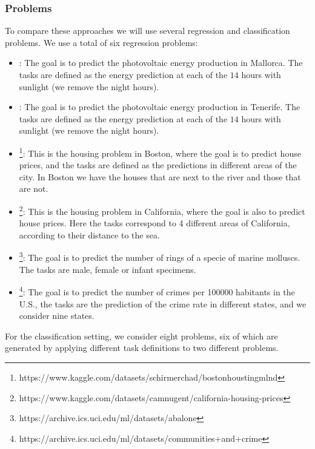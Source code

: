 \subsubsection*{Problems}
To compare these approaches we will use several regression and classification problems. We use a total of six regression problems:
\begin{itemize}
    \item {}: The goal is to predict the photovoltaic energy production in Mallorca. The tasks are defined as the energy prediction at each of the $14$ hours with sunlight (we remove the night hours).
    \item {}: The goal is to predict the photovoltaic energy production in Tenerife. The tasks are defined as the energy prediction at each of the $14$ hours with sunlight (we remove the night hours).
    \item {}\footnote{https://www.kaggle.com/datasets/schirmerchad/bostonhoustingmlnd}: This is the housing problem in Boston, where the goal is to predict house prices, and the tasks are defined as the predictions in different areas of the city. In Boston we have the houses that are next to the river and those that are not. 
    \item {}\footnote{https://www.kaggle.com/datasets/camnugent/california-housing-prices}: This is the housing problem in California, where the goal is also to predict house prices. Here the tasks correspond to 4 different areas of California, according to their distance to the sea.
    \item {}\footnote{https://archive.ics.uci.edu/ml/datasets/abalone}: The goal is to predict the number of rings of a specie of marine molluscs. The tasks are male, female or infant specimens.
    \item {}\footnote{https://archive.ics.uci.edu/ml/datasets/communities+and+crime}: The goal is to predict the number of crimes per \num{100000} habitants in the U.S., the tasks are the prediction of the crime rate in different states, and we consider nine states.
\end{itemize}
For the classification setting, we consider eight problems, six of which are generated by applying different task definitions to two different problems.
